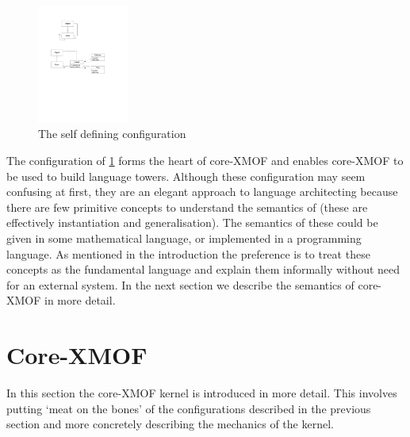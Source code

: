 \begin{figure}[htb]
\begin{center}
\includegraphics[width=3cm]{MetaToolArchitecture/figures/core1.pdf}
\caption{The self defining configuration}
\label{core1}
\end{center}
\end{figure}

The configuration of \ref{core1} forms the heart of core-XMOF and enables core-XMOF to be used to build language towers.  Although these configuration may seem confusing at first, they are an elegant approach to language architecting because there are few primitive concepts to understand the semantics of (these are effectively instantiation and generalisation).  The semantics of these could be given in some mathematical language, or implemented in a programming language.  As mentioned in the introduction the preference is to treat these concepts as the fundamental language and explain them informally without need for an external system.  In the next section we describe the semantics of core-XMOF in more detail.

\FloatBarrier

\section{Core-XMOF}

In this section the core-XMOF kernel is introduced in more detail. This involves putting `meat on the bones' of the configurations described in the previous section and more concretely describing the mechanics of the kernel.

